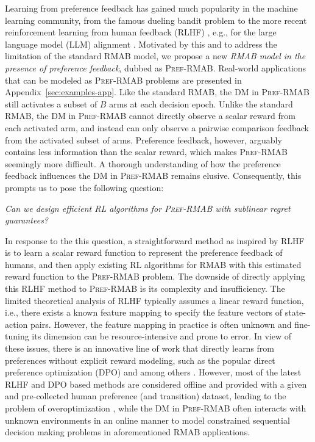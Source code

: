\documentclass{article} %
\newcommand{\RMABPF}{\textsc{Pref-RMAB}\xspace}
\begin{document}
Learning from preference feedback has gained much popularity in the machine learning community, from the famous dueling bandit problem \citep{yue2012k} to the more recent reinforcement learning from human feedback (RLHF) \citep{christiano2017deep,ziegler2019fine}, e.g., for the large language model (LLM) alignment \citep{ouyang2022training}. Motivated by this and to address the limitation of the standard RMAB model, we propose a new \textit{RMAB model in the presence of preference feedback}, dubbed as \RMABPF. Real-world applications that can be modeled as \RMABPF problems are presented in Appendix~\ref{sec:examples-app}.
Like the standard RMAB, the DM in \RMABPF still activates a subset of $B$ arms at each decision epoch. Unlike the standard RMAB, the DM in \RMABPF cannot directly observe a scalar reward from each activated arm, and instead can only observe a pairwise comparison feedback from the activated subset of arms. Preference feedback, however, arguably contains less information than the scalar reward, which makes \RMABPF seemingly more difficult. A thorough understanding of how the preference feedback influences the DM in \RMABPF remains elusive. Consequently, this prompts us to pose the following question: 
\vspace{-0.15in}
\begin{tcolorbox}[colback=white!5!white,colframe=white!75!white]
\textit{Can we design efficient RL algorithms for \RMABPF with sublinear regret guarantees? }
\end{tcolorbox}
\vspace{-0.15in}
In response to the this question, a straightforward method as inspired by RLHF is to learn a scalar reward function to represent the preference feedback of humans, and then apply existing RL algorithms for RMAB with this estimated reward function to the \RMABPF problem. The downside of directly applying this RLHF method to \RMABPF is its complexity and insufficiency. The limited theoretical analysis of RLHF \citep{chen2022human,zhu2023principled,saha2023dueling,du2024exploration} typically assumes a linear reward function, i.e., there exists a known feature mapping to specify the feature vectors of state-action pairs. However, the feature mapping in practice is often unknown and fine-tuning its dimension can be resource-intensive and prone to error. In view of these issues, there is an innovative line of work that directly learns from preferences without explicit reward modeling, such as the popular direct preference optimization (DPO) \citep{rafailov2024direct} and among others \citep{zhao2023slic,azar2024general,ethayarajh2024kto,tang2024generalized}.  However, most of the latest RLHF and DPO based methods are considered offline and provided with a given and pre-collected human preference (and transition) dataset, leading to the problem of overoptimization \citep{xiong2023iterative}, while the DM in \RMABPF often interacts with unknown environments in an online manner to model constrained sequential decision making problems in aforementioned RMAB applications.
\end{document}
